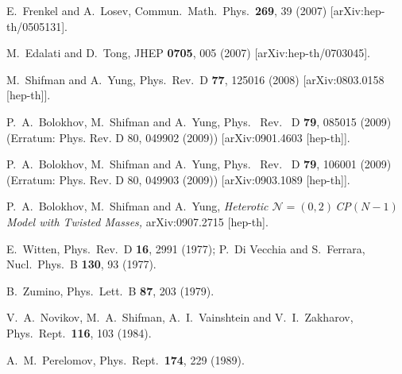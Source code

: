 \documentclass[epsfig,12pt]{article}
\newcommand{\nzt}{${\mathcal N}=(0,2)\,$}
\newcommand{\cpn}{CP$(N-1)\,$}
\begin{document}
\begin{thebibliography}{99}
E.~Frenkel and A.~Losev,
  Commun.\ Math.\ Phys.\  {\bf 269}, 39 (2007)
  [arXiv:hep-th/0505131].
  
 M.~Edalati and D.~Tong,
  JHEP {\bf 0705}, 005 (2007)
  [arXiv:hep-th/0703045].
  
  M.~Shifman and A.~Yung,
  Phys.\ Rev.\  D {\bf 77}, 125016 (2008)
  [arXiv:0803.0158 [hep-th]].
  
P.~A.~Bolokhov, M.~Shifman and A.~Yung,
  Phys. \ Rev. \ D {\bf 79}, 085015 (2009) (Erratum: Phys. Rev. D 80, 049902 (2009))
  [arXiv:0901.4603 [hep-th]].
  
  P.~A.~Bolokhov, M.~Shifman and A.~Yung,
  Phys. \ Rev. \ D {\bf 79}, 106001 (2009) (Erratum: Phys. Rev. D 80, 049903 (2009))
  [arXiv:0903.1089 [hep-th]].
  
  P.~A.~Bolokhov, M.~Shifman and A.~Yung,
{\em Heterotic \nzt \mbox{\cpn} Model with Twisted Masses,}
  arXiv:0907.2715 [hep-th].
  
  E.~Witten,
  Phys.\ Rev.\  D {\bf 16}, 2991 (1977);
  P.~Di Vecchia and S.~Ferrara,
  Nucl.\ Phys.\  B {\bf 130}, 93 (1977).

 B.~Zumino,
  Phys.\ Lett.\  B {\bf 87}, 203 (1979).

 V.~A.~Novikov, M.~A.~Shifman, A.~I.~Vainshtein and V.~I.~Zakharov,
  Phys.\ Rept.\  {\bf 116}, 103 (1984).
   
 A.~M.~Perelomov,
  Phys.\ Rept.\  {\bf 174}, 229 (1989).
  

\end{thebibliography}
\end{document}
